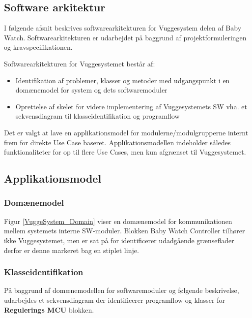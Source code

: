 \newpage
\subsection{Software arkitektur}
\label{Vuggesystem: Software}

I følgende afsnit beskrives softwarearkitekturen for Vuggesystem delen af Baby Watch. Softwarearkitekturen er udarbejdet på baggrund af projektformuleringen og kravspecifikationen. 

\vspace{5mm}

Softwarearkitekturen for Vuggesystemet består af: 
\begin{itemize}
\item Identifikation af problemer, klasser og metoder med udgangspunkt i en domænemodel for system og dets softwaremoduler  
\item Oprettelse af skelet for videre implementering af Vuggesystemets SW vha. et sekvensdiagram til klasseidentifikation og programflow
\end{itemize}

Det er valgt at lave en applikationsmodel for modulerne/modulgrupperne internt frem for direkte Use Case baseret. Applikationsmodellen indeholder således funktionaliteter for op til flere Use Cases, men kun afgrænset til Vuggesystemet. 

\vspace{5mm}
\subsection*{Applikationsmodel} 
\subsubsection*{Domænemodel} 


\vspace{1mm}
Figur \ref{VuggeSystem_Domain} viser en domænemodel for kommunikationen mellem systemets interne SW-moduler. Blokken Baby Watch Controller tilhører ikke Vuggesystemet, men er sat på for identificerer udadgående grænseflader derfor er denne markeret bag en stiplet linje.

\subsubsection*{Klasseidentifikation}
På baggrund af domænemodellen for softwaremoduler og følgende beskrivelse, udarbejdes et sekvensdiagram der identificerer programflow og klasser  for \textbf{Regulerings MCU} blokken.\\
\vspace{1mm}

